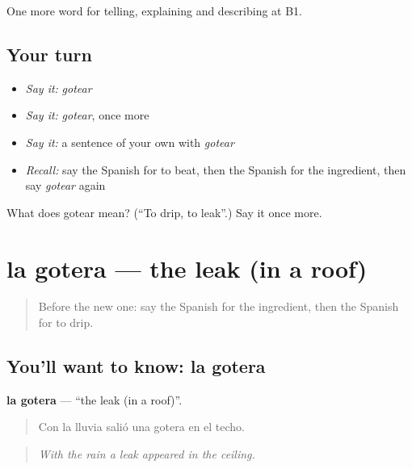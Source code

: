 \begin{grammarlens}[title={What you've built}]
One more word for telling, explaining and describing at B1.
\end{grammarlens}

\subsection*{Your turn}
\begin{itemize}
\raggedright
  \item \emph{Say it:} \emph{gotear}
  \item \emph{Say it:} \emph{gotear}, once more
  \item \emph{Say it:} a sentence of your own with \emph{gotear}
  \item \emph{Recall:} say the Spanish for to beat, then the Spanish for the ingredient, then say \emph{gotear} again
\end{itemize}

\begin{tcolorbox}[breakable,colback=teal!4,colframe=teal!35!black,title={Before you move on}]
What does gotear mean? (\textquotedblleft{}To drip, to leak\textquotedblright{}.) Say it once more.
\end{tcolorbox}
\section[la gotera]{la gotera — the leak (in a roof)}

\label{lesson:ES-C769-gotera}



\begin{quote}
Before the new one: say the Spanish for the ingredient, then the Spanish for to drip.
\end{quote}

\subsection*{You'll want to know: la gotera}
\textbf{la gotera} — \textquotedblleft{}the leak (in a roof)\textquotedblright{}.

\begin{quote}
Con la lluvia salió una gotera en el techo.
\end{quote}

\begin{quote}
\emph{With the rain a leak appeared in the ceiling.}
\end{quote}

